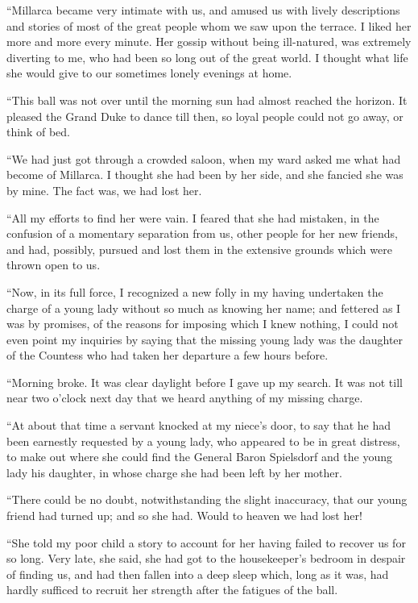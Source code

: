 \documentclass[11pt,twoside,makeidx,hidelinks,]{memoir}
\begin{document}
``Millarca became very intimate with us, and amused us with lively
descriptions and stories of most of the great people whom we saw upon
the terrace. I liked her more and more every minute. Her gossip without
being ill-natured, was extremely diverting to me, who had been so long
out of the great world. I thought what life she would give to our
sometimes lonely evenings at home.

``This ball was not over until the morning sun had almost reached the
horizon. It pleased the Grand Duke to dance till then, so loyal people
could not go away, or think of bed.

``We had just got through a crowded saloon, when my ward asked me what
had become of Millarca. I thought she had been by her side, and she
fancied she was by mine. The fact was, we had lost her.

``All my efforts to find her were vain. I feared that she had mistaken,
in the confusion of a momentary separation from us, other people for her
new friends, and had, possibly, pursued and lost them in the extensive
grounds which were thrown open to us.

``Now, in its full force, I recognized a new folly in my having
undertaken the charge of a young lady without so much as knowing her
name; and fettered as I was by promises, of the reasons for imposing
which I knew nothing, I could not even point my inquiries by saying that
the missing young lady was the daughter of the Countess who had taken
her departure a few hours before.

``Morning broke. It was clear daylight before I gave up my search. It was
not till near two o'clock next day that we heard anything of my
missing charge.

``At about that time a servant knocked at my niece's door, to say that he
had been earnestly requested by a young lady, who appeared to be in
great distress, to make out where she could find the General Baron
Spielsdorf and the young lady his daughter, in whose charge she had been
left by her mother.

``There could be no doubt, notwithstanding the slight inaccuracy, that
our young friend had turned up; and so she had. Would to heaven we
had lost her!

``She told my poor child a story to account for her having failed to
recover us for so long. Very late, she said, she had got to the
housekeeper's bedroom in despair of finding us, and had then fallen
into a deep sleep which, long as it was, had hardly sufficed to recruit
her strength after the fatigues of the ball.
\end{document}

